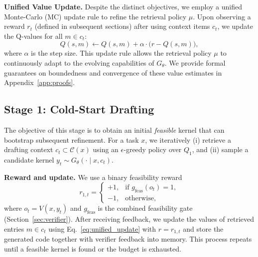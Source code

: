 \documentclass{article} %
\theoremstyle{definition}
\theoremstyle{remark}
\begin{document}
\textbf{Unified Value Update.}
Despite the distinct objectives, we employ a unified Monte-Carlo (MC) update rule to refine the retrieval policy $\mu$. Upon observing a reward $r_t$ (defined in subsequent sections) after using context items $c_t$, we update the Q-values for all $m \in c_t$:
\begin{equation}
  \label{eq:unified_update}
  Q(s, m) \leftarrow Q(s, m) + \alpha \cdot \big(r - Q(s, m)\big),
\end{equation}
where $\alpha$ is the step size. This update rule allows the retrieval policy $\mu$ to continuously adapt to the evolving capabilities of $G_\theta$. We provide formal guarantees on boundedness and convergence of these value estimates in Appendix~\ref{app:proofs}.

\subsection{Stage 1: Cold-Start Drafting}
\label{sec:stage1}
The objective of this stage is to obtain an initial \emph{feasible} kernel that can bootstrap subsequent refinement.
For a task $x$, we iteratively (i) retrieve a drafting context $c_t \subset \mathcal{C}(x)$ using an $\epsilon$-greedy policy over $Q_{1}$, and (ii) sample a candidate kernel $y_t \sim G_\theta(\cdot \mid x,c_t)$.

\textbf{Reward and update.}
We use a binary feasibility reward
\begin{equation}
r_{1,t}=
\begin{cases}
+1, & \text{if } g_{\text{feas}}(o_t)=1,\\
-1, & \text{otherwise},
\end{cases}
\end{equation}
where $o_t=V(x,y_t)$ and $g_{\text{feas}}$ is the combined feasibility gate (Section~\ref{sec:verifier}).
After receiving feedback, we update the values of retrieved entries $m \in c_t$ using Eq.~\ref{eq:unified_update} with $r=r_{1,t}$ and store the generated code together with verifier feedback into memory. This process repeats until a feasible kernel is found or the budget is exhausted.
\end{document}
